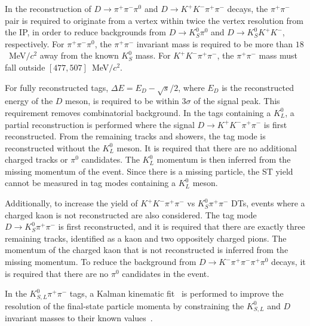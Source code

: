 \documentclass[12pt, a4paper, notitlepage, onecolumn]{article}
\begin{document}
In the reconstruction of $D\to\pi^+\pi^-\pi^0$ and $D\to K^+K^-\pi^+\pi^-$ decays, the $\pi^+\pi^-$ pair is required to originate from a vertex within twice the vertex resolution from the IP, in order to reduce backgrounds from $D\to K_S^0\pi^0$ and $D\to K_S^0K^+K^-$, respectively. For $\pi^+\pi^-\pi^0$, the $\pi^+\pi^-$ invariant mass is required to be more than $18$~MeV$/c^2$ away from the known $K_S^0$ mass. For $K^+K^-\pi^+\pi^-$, the $\pi^+\pi^-$ mass must fall outside $[477, 507]$~MeV$/c^2$.

For fully reconstructed tags, $\Delta E = E_D - \sqrt{s}/2$, where $E_D$ is the reconstructed energy of the $D$ meson, is required to be within $3\sigma$ of the signal peak. This requirement removes combinatorial background. In the tags containing a $K_L^0$, a partial reconstruction is performed where the signal $D\to K^+K^-\pi^+\pi^-$ is first reconstructed. From the remaining tracks and showers, the tag mode is reconstructed without the $K_L^0$ meson. It is required that there are no additional charged tracks or $\pi^0$ candidates. The $K_L^0$ momentum is then inferred from the missing momentum of the event. Since there is a missing particle, the ST yield cannot be measured in tag modes containing a $K_L^0$ meson.

Additionally, to increase the yield of $K^+K^-\pi^+\pi^-$ vs $K_S^0\pi^+\pi^-$ DTs, events where a charged kaon is not reconstructed are also considered. The tag mode $D\to K_S^0\pi^+\pi^-$ is first reconstructed, and it is required that there are exactly three remaining tracks, identified as a kaon and two oppositely charged pions. The momentum of the charged kaon that is not reconstructed is inferred from the missing momentum. To reduce the background from $D\to K^-\pi^+\pi^-\pi^+\pi^0$ decays, it is required that there are no $\pi^0$ candidates in the event.

In the $K_{S, L}^0\pi^+\pi^-$ tags, a Kalman kinematic fit~\cite{KalmanFit_cite} is performed to improve the resolution of the final-state particle momenta by constraining the $K_{S, L}^0$ and $D$ invariant masses to their known values~\cite{pdg}.

\end{document}
